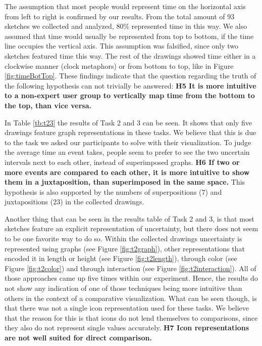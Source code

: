 The assumption that most people would represent time on the horizontal axis from left to right is confirmed by our results. From the total amount of 93 sketches we collected and analyzed, 80\% represented time in this way. We also assumed that time would usually be represented from top to bottom, if the time line occupies the vertical axis. This assumption was falsified, since only two sketches featured time this way. The rest of the drawings showed time either in a clockwise manner (clock metaphors) or from bottom to top, like in Figure \ref{fig:timeBotTop}. These findings indicate that the question regarding the truth of the following hypothesis can not trivially be answered: \textbf{H5 It is more intuitive to a non-expert user group to vertically map time from the bottom to the top, than vice versa.}\par \medskip


In Table \ref{tb:t23} the results of Task 2 and 3 can be seen. It shows that only five drawings feature graph representations in these tasks. We believe that this is due to the task we asked our participants to solve with their visualization. To judge the average time an event takes, people seem to prefer to see the two uncertain intervals next to each other, instead of superimposed graphs. \textbf{H6 If two or more events are compared to each other, it is more intuitive to show them in a juxtaposition, than superimposed in the same space.} This hypothesis is also supported by the numbers of superpositions (7) and juxtapositions (23) in the collected drawings. \par \medskip

Another thing that can be seen in the results table of Task 2 and 3, is that most sketches feature an explicit representation of uncertainty, but there does not seem to be one favorite way to do so. Within the collected drawings uncertainty is represented using graphs (see Figure \ref{fig:t2graph}), other representations that encoded it in length or height (see Figure \ref{fig:t2length}), through color (see Figure \ref{fig:t2color}) and through interaction (see Figure \ref{fig:t2interaction}). All of those approaches came up five times within our experiment. Hence, the results do not show any indication of one of those techniques being more intuitive than others in the context of a comparative visualization. What can be seen though, is that there was not a single icon representation used for these tasks. We believe that the reason for this is that icons do not lend themselves to comparisons, since they also do not represent single values accurately. \textbf{H7 Icon representations are not well suited for direct comparison.} \par \medskip


